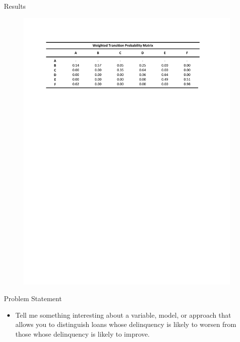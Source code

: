 \documentclass{beamer}
\begin{document}
\begin{frame}{Results}{}
\begin{itemize}
\begin{figure}
\begin{center}
					\includegraphics[width=1\textwidth]{wgt_trp_mat.pdf} 
				\end{center}
			\end{figure}
		\vspace{-0.in}
	\end{itemize}
\end{frame}

\begin{frame}{Problem Statement}{}
	\begin{itemize}
		\item{Tell me something interesting about a variable, model, or approach that allows you to distinguish loans whose delinquency is likely to worsen from those whose delinquency is likely to improve.} \vspace{0 in} 
	\end{itemize}
\end{frame}
\end{document}
